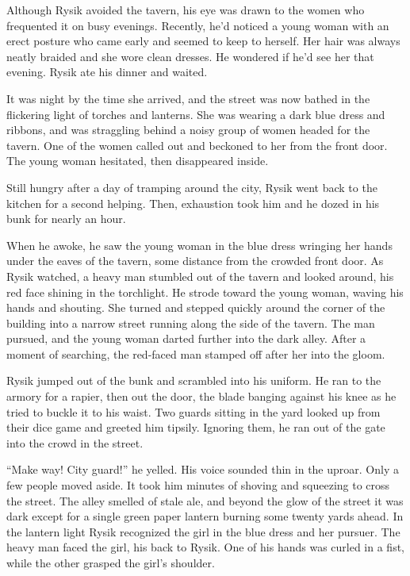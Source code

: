 \documentclass[10pt,a4paper]{article}
\begin{document}
Although Rysik avoided the tavern, his eye was drawn to the women
who frequented it on busy evenings. Recently, he'd noticed a young
woman with an erect posture who came early and seemed to keep to
herself. Her hair was always neatly braided and she wore clean
dresses. He wondered if he'd see her that evening. Rysik ate his
dinner and waited.

It was night by the time she arrived, and the street was now bathed
in the flickering light of torches and lanterns. She was wearing
a dark blue dress and ribbons, and was straggling behind a noisy
group of women headed for the tavern. One of the women called out
and beckoned to her from the front door. The young woman hesitated,
then disappeared inside.

Still hungry after a day of tramping around the city, Rysik went
back to the kitchen for a second helping. Then, exhaustion took
him and he dozed in his bunk for nearly an hour.

When he awoke, he saw the young woman in the blue dress wringing her
hands under the eaves of the tavern, some distance from the crowded
front door. As Rysik watched, a heavy man stumbled out of the tavern
and looked around, his red face shining in the torchlight. He strode
toward the young woman, waving his hands and shouting. She turned
and stepped quickly around the corner of the building into a narrow
street running along the side of the tavern. The man pursued, and
the young woman darted further into the dark alley. After a moment
of searching, the red-faced man stamped off after her into the gloom.

Rysik jumped out of the bunk and scrambled into his uniform. He ran
to the armory for a rapier, then out the door, the blade banging
against his knee as he tried to buckle it to his waist. Two guards
sitting in the yard looked up from their dice game and greeted him
tipsily. Ignoring them, he ran out of the gate into the crowd in
the street.

``Make way! City guard!'' he yelled. His voice sounded thin in the
uproar. Only a few people moved aside. It took him minutes of
shoving and squeezing to cross the street. The alley smelled of
stale ale, and beyond the glow of the street it was dark except for
a single green paper lantern burning some twenty yards ahead. In
the lantern light Rysik recognized the girl in the blue dress and
her pursuer. The heavy man faced the girl, his back to Rysik. One
of his hands was curled in a fist, while the other grasped the
girl's shoulder.
\end{document}

